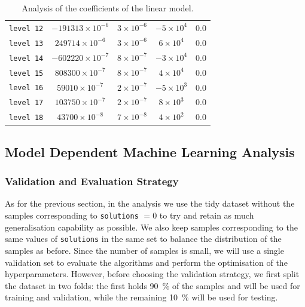 \begin{table}[htbp]
\begin{tabular}{@{}ccccc@{}}
  \texttt{level 12}  & $-191313 \times 10^{-6}$    & $3 \times 10^{-6}$      & $-5 \times 10^4$     & 0.0                                       \\
  \texttt{level 13}  & $249714 \times 10^{-6}$     & $3 \times 10^{-6}$      & $6 \times 10^4$      & 0.0                                       \\
  \texttt{level 14}  & $-602220 \times 10^{-7}$    & $8 \times 10^{-7}$      & $-3 \times 10^4$     & 0.0                                       \\
  \texttt{level 15}  & $808300 \times 10^{-7}$     & $8 \times 10^{-7}$      & $4 \times 10^4$      & 0.0                                       \\
  \texttt{level 16}  & $59010 \times 10^{-7}$      & $2 \times 10^{-7}$      & $-5 \times 10^3$     & 0.0                                       \\
  \texttt{level 17}  & $103750 \times 10^{-7}$     & $2 \times 10^{-7}$      & $8 \times 10^3$      & 0.0                                       \\
  \texttt{level 18}  & $43700 \times 10^{-8}$      & $7 \times 10^{-8}$      & $4 \times 10^2$      & 0.0                                       \\
  \bottomrule
  \end{tabular}%
  \caption{Analysis of the coefficients of the linear model.}
  \label{tab:lumps:anova}
\end{table}


\subsection{Model Dependent Machine Learning Analysis}

\subsubsection{Validation and Evaluation Strategy}

As for the previous section, in the \ml analysis we use the tidy dataset without the samples corresponding to \texttt{solutions} $= 0$ to try and retain as much generalisation capability as possible.
We also keep samples corresponding to the same values of \texttt{solutions} in the same set to balance the distribution of the samples as before.
Since the number of samples is small, we will use a single validation set to evaluate the algorithms and perform the optimisation of the hyperparameters.
However, before choosing the validation strategy, we first split the dataset in two folds: the first holds \SI{90}{\percent} of the samples and will be used for training and validation, while the remaining \SI{10}{\percent} will be used for testing.


